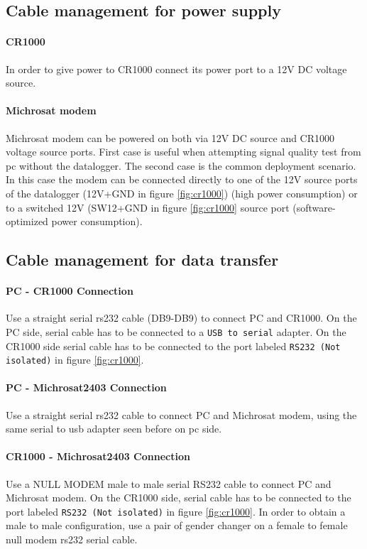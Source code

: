 \subsection{Cable management for power supply}
\paragraph{CR1000}
In order to give power to CR1000 connect its power port to a 12V DC voltage source.
\paragraph{Michrosat modem}
Michrosat modem can be powered on both via 12V DC source and CR1000 voltage source ports. First case is useful when attempting signal quality test from pc without the datalogger.
The second case is the common deployment scenario. In this case the modem can be connected directly to one of the 12V source ports of the datalogger (12V+GND in figure \ref{fig:cr1000}) (high power consumption) or to a switched 12V (SW12+GND in figure \ref{fig:cr1000} source port (software-optimized power consumption).
\subsection{Cable management for data transfer}
\label{subsec:datacable}
\paragraph{PC - CR1000 Connection}
Use a straight serial rs232 cable (DB9-DB9) to connect PC and CR1000. On the PC side, serial cable has to be connected to a {\tt USB to serial} adapter. On the CR1000 side serial cable has to be connected to the port labeled {\tt RS232 (Not isolated)} in figure \ref{fig:cr1000}.
\paragraph{PC - Michrosat2403 Connection}
Use a straight serial rs232 cable to connect PC and Michrosat modem, using the same serial to usb adapter seen before on pc side.
\paragraph{CR1000 - Michrosat2403 Connection}
Use a NULL MODEM male to male serial RS232 cable to connect PC and Michrosat modem. On the CR1000 side, serial cable has to be connected to the port labeled {\tt RS232 (Not isolated)} in figure \ref{fig:cr1000}. In order to obtain a male to male configuration, use a pair of gender changer on a female to female null modem rs232 serial cable.